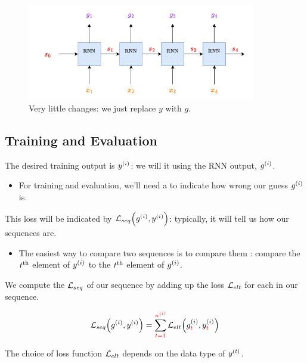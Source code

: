         \begin{figure}[H]
            \centering
            \includegraphics[width=100mm]{images/rnn_images/rnn_simple_g_notation.png}
            \caption*{Very little changes: we just replace $y$ with $g$.}
        \end{figure}




    \phantom{}

    \subsection{Training and Evaluation}

        The desired training output is $y^{(i)}$: we will  it using the RNN output, $g^{(i)}$.

        \begin{itemize}
            \item For training and evaluation, we'll need a  to indicate how wrong our guess $g^{(i)}$ is.
        \end{itemize}

        This loss will be indicated by $\mathcal{L}_{seq} \Big(g^{(i)}, y^{(i)} \Big)$: typically, it will tell us how  our sequences are.

        \begin{itemize}
            \item The easiest way to compare two sequences is to compare them : compare the $t^{ \text{th} }$ element of $y^{(i)}$ to the $t^{ \text{th} }$ element of  $g^{(i)}$.\\
        \end{itemize}

        \begin{definition}
            We compute the  $\mathcal{L}_{seq}$ of our sequence by adding up the loss $\mathcal{L}_{elt}$ for each  in our sequence.

            \begin{equation*}
                \mathcal{L}_{seq} \Big(
                    g^{(i)}, y^{(i)} 
                \Big) = 
                \sum_{ \textcolor{red}{t=1} }^{\textcolor{red}{n^{(i)}}} 
                \mathcal{L}_{elt} \Big( 
                    g_{\textcolor{red}{t}} ^{(i)}, y_{\textcolor{red}{t}} ^{(i)} 
                \Big)
            \end{equation*}

            The choice of loss function $\mathcal{L}_{elt}$ depends on the data type of $y^{(t)}$.
        \end{definition}

